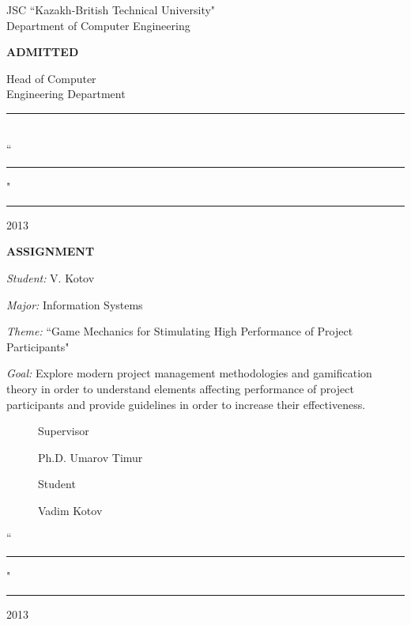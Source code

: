 \begin{titlepage}
\begin{center}
{		JSC ``Kazakh-British Technical University"\\
		Department of Computer Engineering}

		\begin{flushright}
			{\bf \MakeUppercase{Admitted}}

			Head of Computer\\
			Engineering Department\\
			\vspace{0.5\baselineskip}
			\rule{13em}{0.4pt}\\

			\vspace{0.5\baselineskip}
			``\rule{2em}{0.4pt}" \rule{8em}{0.4pt} 2013\\
		    \end{flushright}
		
		{\bf
		\MakeUppercase{Assignment}}

		\vspace{14pt}

	\end{center}

	\setlength{\parindent}{0pt}
	\setlength{\parskip}{1ex plus 0.5ex minus 0.2ex}

	\emph{Student:} V. Kotov

	\emph{Major:} Information Systems

	\emph{Theme:} ``Game Mechanics for Stimulating High Performance of Project Participants"
    
   \emph{Goal:}
	Explore modern project management methodologies and gamification theory in order to understand elements affecting performance of project participants and provide guidelines in order to increase their effectiveness.

	\begin{figure}[ht]
		\begin{minipage}[t]{0.5\linewidth}
			Supervisor
		\end{minipage}
		\begin{minipage}[t]{0.5\linewidth}
			Ph.D. Umarov Timur
		\end{minipage}
	\end{figure}
	\begin{figure}[ht]
		\begin{minipage}[t]{0.5\linewidth}
			Student
		\end{minipage}
		\begin{minipage}[t]{0.5\linewidth}
			Vadim Kotov
		\end{minipage}
	\end{figure}
	``\rule{2em}{0.4pt}" \rule{8em}{0.4pt} 2013\\


\end{titlepage}
